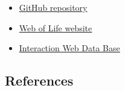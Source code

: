\documentclass[a4paper, 12pt]{article}
\begin{document}
\begin{itemize}
    \item \href{https://github.com/lucascamacho/coevo_mut_antag}{GitHub repository}
    \item \href{http://www.web-of-life.es}{Web of Life website}
    \item \href{https://www.nceas.ucsb.edu/interactionweb/}{Interaction Web Data Base}
\end{itemize}

\begin{singlespace}
\subsection*{References}
\printbibliography[heading = none]

\end{singlespace}
\newpage
\end{document}
